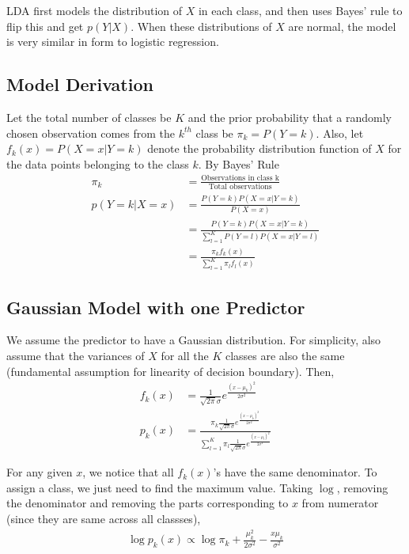 \documentclass[../statistical_learning_notes.tex]{subfiles}
\begin{document}
    LDA first models the distribution of $X$ in each class, and then uses Bayes' rule to flip this and get $p(Y|X)$. When these distributions of $X$ are normal, the model is very similar in form to logistic regression.

    \subsection{Model Derivation}
    Let the total number of classes be $K$ and the prior probability that a randomly chosen observation comes from the $k^{th}$ class be $\pi_{k} = P(Y=k)$. Also, let $f_{k}(x) = P(X=x|Y=k)$ denote the probability distribution function of $X$ for the data points belonging to the class $k$. By Bayes' Rule
    \begin{align*}
        \pi_{k} &= \frac{\text{Observations in class k}}{\text{Total observations}}\\
        p(Y=k|X=x) &= \frac{P(Y=k)P(X=x|Y=k)}{P(X=x)}\\
                &= \frac{P(Y=k)P(X=x|Y=k)}{\sum_{l=1}^{K} P(Y=l)P(X=x|Y=l)}\\
                &=  \frac{\pi_{k}f_{k}(x)}{\sum_{l=1}^{K}\pi_{l}f_{l}(x)}
    \end{align*}

    \subsection{Gaussian Model with one Predictor}
    We assume the predictor to have a Gaussian distribution. For simplicity, also assume that the variances of $X$ for all the $K$ classes are also the same (fundamental assumption for linearity of decision boundary). Then,
    \begin{align*}
        f_{k}(x) &= \frac{1}{\sqrt{2\pi}\sigma}e^{\frac{(x-\mu_{k})^{2}}{2\sigma^{2}}}\\
        p_{k}(x) &= \frac{\pi_{k}\frac{1}{\sqrt{2\pi}\sigma}e^{\frac{(x-\mu_{k})^{2}}{2\sigma^{2}}}}{\sum_{l=1}^{K}\pi_{l}\frac{1}{\sqrt{2\pi}\sigma}e^{\frac{(x-\mu_{l})^{2}}{2\sigma^{2}}}}
    \end{align*}
    
    For any given $x$, we notice that all $f_{k}(x)$'s have the same denominator. To assign a class, we just need to find the maximum value. Taking $\log$, removing the denominator and removing the parts corresponding to $x$ from numerator (since they are same across all classses),
    \begin{align*}
        \log{p_{k}(x)} \propto \log{\pi_{k}} + \frac{\mu_{k}^{2}}{2\sigma^{2}} - \frac{x\mu_{k}}{\sigma^{2}}
    \end{align*}
\end{document}
